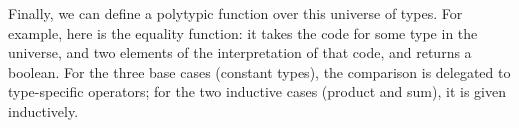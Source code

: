 \documentclass[fleqn,runningheads]{llncs}
\begin{document}
Finally, we can define a polytypic function over this universe of types. For example, here is the equality function: it takes the code for some type in the universe, and two elements of the interpretation of that code, and returns a boolean. For the three base cases (constant types), the comparison is delegated to type-specific operators; for the two inductive cases (product and sum), it is given inductively.
\begin{code}%
\>[0]\AgdaSpace{}%
\AgdaSymbol{:}\AgdaSpace{}%
\AgdaSymbol{\{}\AgdaSpace{}%
\AgdaSpace{}%
\AgdaSymbol{:}\AgdaSpace{}%
\AgdaSpace{}%
\AgdaSymbol{\}}\AgdaSpace{}%
\AgdaSpace{}%
\AgdaOperator{\AgdaFunction{[[}}\AgdaSpace{}%
\AgdaSpace{}%
\AgdaOperator{\AgdaFunction{]]₀}}\AgdaSpace{}%
\AgdaSpace{}%
\AgdaOperator{\AgdaFunction{[[}}\AgdaSpace{}%
\AgdaSpace{}%
\AgdaOperator{\AgdaFunction{]]₀}}\AgdaSpace{}%
\AgdaSpace{}%
\<%
\\
\>[0]\AgdaSpace{}%
\AgdaSymbol{\{}\AgdaSymbol{\}}%
\>[19]%
\>[30]%
\>[41]\AgdaSymbol{=}\AgdaSpace{}%
\AgdaSymbol{(}\AgdaSpace{}%
\AgdaSpace{}%
\AgdaSymbol{)}\<%
\\
\>[0]\AgdaSpace{}%
\AgdaSymbol{\{}\AgdaSymbol{\}}%
\>[19]%
\>[30]%
\>[41]\AgdaSymbol{=}\AgdaSpace{}%
\AgdaSymbol{(}\AgdaSpace{}%
\AgdaSpace{}%
\AgdaSymbol{)}\<%
\\
\>[0]\AgdaSpace{}%
\AgdaSymbol{\{}\AgdaSymbol{\}}%
\>[19]%
\>[30]%
\>[41]\AgdaSymbol{=}\AgdaSpace{}%
\AgdaSymbol{(}\AgdaSpace{}%
\AgdaSpace{}%
\AgdaSymbol{)}\<%
\\
\>[0]\AgdaSpace{}%
\AgdaSymbol{\{}\AgdaSpace{}%

\end{code}
\end{document}
